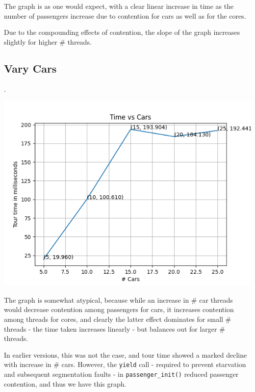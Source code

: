 \documentclass{amsart}
\begin{document}
The graph is as one would expect, with a clear linear increase in time as the number of passengers increase due to contention for cars as well as for the cores.

Due to the compounding effects of contention, the slope of the graph increases slightly for higher \# threads.

\subsection{Vary Cars}.

\includegraphics[scale = 0.9]{../cars.png}

The graph is somewhat atypical, because while an increase in \# car threads would decrease contention among passengers for cars, it increases contention among threads for cores, and clearly the latter effect dominates for small \# threads - the time taken increases linearly - but balances out for larger \# threads.

In earlier versions, this was not the case, and tour time showed a marked decline with increase in \# cars. However, the \texttt{yield} call - required to prevent starvation and subsequent segmentation faults - in \texttt{passenger\_init()} reduced passenger contention, and thus we have this graph.
\end{document}
